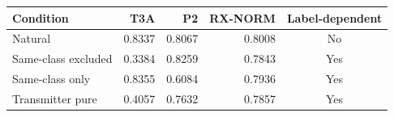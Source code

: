 \begingroup
\setlength{\tabcolsep}{9pt}
\begin{tabular}{lrrrc}
\toprule
Condition & T3A & P2 & RX-NORM & Label-dependent\\
\midrule
Natural & 0.8337 & 0.8067 & 0.8008 & No\\
Same-class excluded & 0.3384 & 0.8259 & 0.7843 & Yes\\
Same-class only & 0.8355 & 0.6084 & 0.7936 & Yes\\
Transmitter pure & 0.4057 & 0.7632 & 0.7857 & Yes\\
\bottomrule
\end{tabular}
\endgroup
